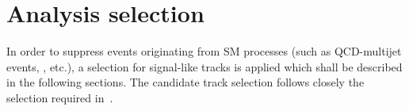\section{Analysis selection}
\label{sec:AnalysisSelection}

In order to suppress events originating from SM processes (such as QCD-multijet events, \WJets, etc.), a selection for signal-like tracks is applied which shall be described in the following sections.
The candidate track selection follows closely the selection required in~\cite{bib:CMS:DT_Thesis,bib:CMS:DT_8TeV_AN}.\\

